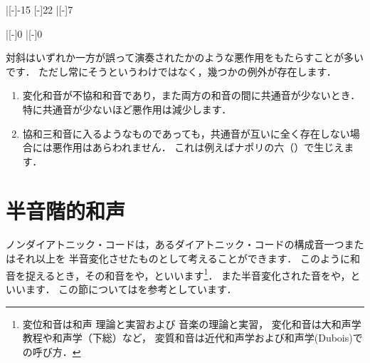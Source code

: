 \documentclass[dvipdfmx,uplatex,b5paper,openany,jbase=12Q,nomag*,textwidth-limit=44%
               ]{gachimuchi}[2020/05/05]
\begin{document}
\begin{Music}
  \Startpiece%
  \Notes%
  |[-\QNwidth]{-15}%
  \en\doublebar%
  \Notes%
  [-\QNwidth]{22}%
  |[-\QNwidth]{7}%
  \en\setdoublebar%
  \endpiece%
\end{Music}
\begin{Music}
  \Startpiece%
  \Notes%
  |[-\QNwidth]{0}%
  \en\doublebar%
  \Notes%
  |[-\QNwidth]{0}%
  \en\setdoublebar%
  \endpiece%
\end{Music}

対斜はいずれか一方が誤って演奏されたかのような悪作用をもたらすことが多いです．
ただし常にそうというわけではなく，幾つかの例外が存在します．
\begin{enumerate}
  \item 変化和音が不協和和音であり，また両方の和音の間に共通音が少ないとき．
        特に共通音が少ないほど悪作用は減少します．
  \item 協和三和音に入るようなものであっても，共通音が互いに全く存在しない場合には悪作用はあらわれません．
        これは例えばナポリの六（）で生じえます．
\end{enumerate}

\section{半音階的和声}%
ノンダイアトニック・コードは，あるダイアトニック・コードの構成音一つまたはそれ以上を
半音変化させたものとして考えることができます．
このように和音を捉えるとき，その和音をや，といいます\footnote{%
  変位和音は和声 理論と実習\cite{chSHIMAOKA1i,chSHIMAOKA1ii,chSHIMAOKA1iii}および
            音楽の理論と実習\cite{ctSHIMAOKA1i,ctSHIMAOKA1ii,ctSHIMAOKA1iii}，
  変化和音は大和声学教程\cite{chHASEGAWA1}や和声学（下総）\cite{chSHIMOFUSA1}など，
  変質和音は近代和声学\cite{chMATSUDAIRA1}および和声学(Dubois)\cite{chDUBOIS1}での呼び方．
}．
また半音変化された音をや，といいます．
この節についてはを参考としています．
\end{document}
